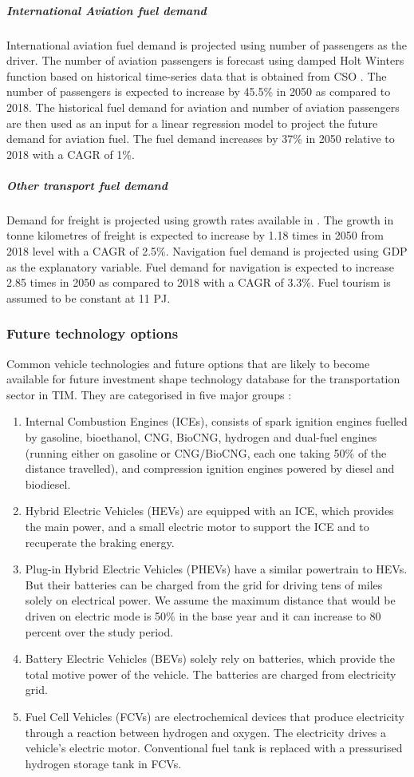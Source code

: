 \documentclass[gmd,manuscript]{copernicus}
\begin{document}
\subparagraph{International Aviation fuel demand}
International aviation fuel demand is projected using number of passengers as the driver. The number of aviation passengers is forecast using damped Holt Winters function based on historical time-series data that is obtained from CSO \citep{Dantas2017,Grubb2001}. The number of passengers is expected to increase by 45.5\% in 2050 as compared to 2018. The historical fuel demand for aviation and number of aviation passengers are then used as an input for a linear regression model to project the future demand for aviation fuel. The fuel demand increases by 37\% in 2050 relative to 2018 with a CAGR of 1\%. 

\subparagraph{Other transport fuel demand}
Demand for freight is projected using growth rates available in \citep{AECOMIrelandLimited2019}. The growth in tonne kilometres of freight is expected to increase by 1.18 times in 2050 from 2018 level with a CAGR of 2.5\%. Navigation fuel demand is projected using GDP as the explanatory variable. Fuel demand for navigation is expected to increase 2.85 times in 2050 as compared to 2018 with a CAGR of 3.3\%. Fuel tourism is assumed to be constant at 11 PJ. 

\subsubsection{Future technology options}

Common vehicle technologies and future options that are likely to become available for future investment shape technology database for the transportation sector in TIM. They are categorised in five major groups \citep{Aryanpur2015}:
\begin{enumerate}
 \item Internal Combustion Engines (ICEs), consists of spark ignition engines fuelled by gasoline, bioethanol, CNG, BioCNG, hydrogen and dual-fuel engines (running either on gasoline or CNG/BioCNG, each one taking 50\% of the distance travelled), and compression ignition engines powered by diesel and biodiesel. 
\item Hybrid Electric Vehicles (HEVs) are equipped with an ICE, which provides the main power, and a small electric motor to support the ICE and to recuperate the braking energy. 
\item Plug-in Hybrid Electric Vehicles (PHEVs) have a similar powertrain to HEVs. But their batteries can be charged from the grid for driving tens of miles solely on electrical power. We assume the maximum distance that would be driven on electric mode is 50\% in the base year and it can increase to 80 percent over the study period. 
\item Battery Electric Vehicles (BEVs) solely rely on batteries, which provide the total motive power of the vehicle. The batteries are charged from electricity grid. 
\item Fuel Cell Vehicles (FCVs) are electrochemical devices that produce electricity through a reaction between hydrogen and oxygen. The electricity drives a vehicle’s electric motor. Conventional fuel tank is replaced with a pressurised hydrogen storage tank in FCVs. 
\end{enumerate}
\end{document}
